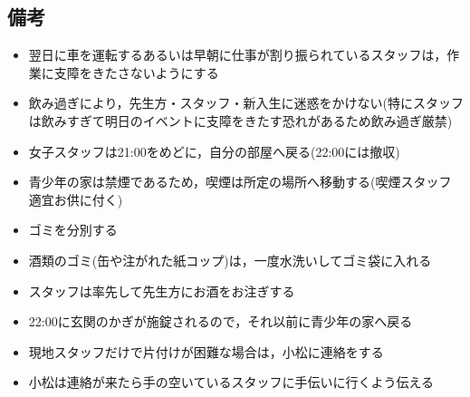 \subsection{備考}
\begin{itemize}
	\item 翌日に車を運転するあるいは早朝に仕事が割り振られているスタッフは，作業に支障をきたさないようにする
	\item 飲み過ぎにより，先生方・スタッフ・新入生に迷惑をかけない(特にスタッフは飲みすぎて明日のイベントに支障をきたす恐れがあるため飲み過ぎ厳禁)
	\item 女子スタッフは21:00をめどに，自分の部屋へ戻る(22:00には撤収)
	\item 青少年の家は禁煙であるため，喫煙は所定の場所へ移動する(喫煙スタッフ適宜お供に付く)
	\item ゴミを分別する
	\item 酒類のゴミ(缶や注がれた紙コップ)は，一度水洗いしてゴミ袋に入れる
	\item スタッフは率先して先生方にお酒をお注ぎする
	\item 22:00に玄関のかぎが施錠されるので，それ以前に青少年の家へ戻る
	\item 現地スタッフだけで片付けが困難な場合は，小松に連絡をする
	\item 小松は連絡が来たら手の空いているスタッフに手伝いに行くよう伝える
\end{itemize}

%
